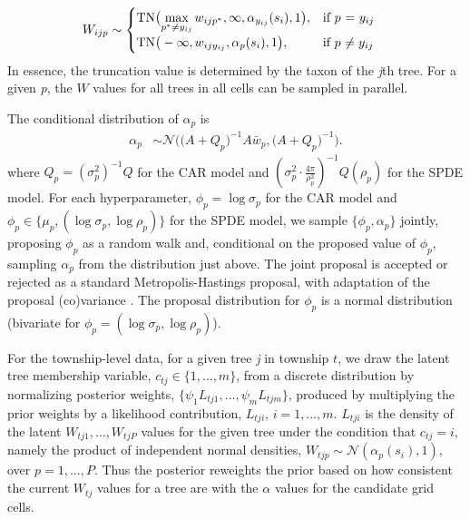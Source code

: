 \documentclass[10pt,letterpaper]{article}
\newcommand{\N}{\mathcal{N}}
\begin{document}
\begin{align}
W_{ijp} & \sim\begin{cases}
\mbox{TN}\big({\displaystyle \max_{p^{*}\neq y_{ij}}w_{ijp^{*}},\infty,\alpha_{y_{ij}}(s_{i}),1\big),} & \mbox{if }p\mbox{ = \ensuremath{y_{ij}}}\\
\mbox{TN}\big(-\infty,w_{ijy_{ij}},\alpha_{p}(s_{i}),1\big), & \mbox{if }p\mbox{ \ensuremath{\neq y_{ij}}}
\end{cases} \nonumber
\end{align}
In essence, the truncation value is determined by the taxon of the
\emph{j}th tree. For a given \emph{p}, the $W$ values for all trees in all
cells can be sampled in parallel. 

The conditional distribution of $\alpha_{p}$ is 
\begin{align}
\alpha_{p} & \sim\N\bigg(\Big(A+Q_{p}\Big)^{-1}A\bar{w}_{p},\Big(A+Q_{p}\Big)^{-1}\bigg). \nonumber
\end{align}
where $Q_{p}=(\sigma_{p}^{2})^{-1}Q$ for the CAR model and $\left(\sigma_{p}^{2}\cdot\frac{4\pi}{\rho_{p}^{2}}\right)^{-1}Q(\rho_{p})$
for the SPDE model. For each hyperparameter, $\phi_{p}=\log\sigma_{p}$
for the CAR model and $\phi_{p}\in\{\mu_{p},(\log\sigma_{p},\log\rho_{p})\}$
for the SPDE model, we sample $\{\phi_{p},\alpha_{p}\}$ jointly,
proposing $\phi_{p}$ as a random walk and, conditional on the proposed
value of $\phi_{p}$, sampling $\alpha_{p}$ from the distribution
just above. The joint proposal is accepted or rejected as a standard
Metropolis-Hastings proposal, with adaptation of the proposal (co)variance
\cite{Shab:Well:2011}. The proposal distribution for $\phi_{p}$
is a normal distribution (bivariate for $\phi_{p}=(\log\sigma_{p},\log\rho_{p})$).

\noindent 

For the township-level data, for a given tree \emph{j} in township $t$,
we draw the latent tree membership variable, $c_{tj}\in\{1,\ldots,m\}$,
from a discrete distribution by normalizing posterior weights, $\{\psi_{1}L_{tj1},\ldots,\psi_{m}L_{tjm}\}$,
produced by multiplying the prior weights by a likelihood contribution,
$L_{tji}$, $i=1,\ldots,m$. $L_{tji}$ is the density of the latent
$W_{tj1},\ldots,W_{tjP}$ values for the given tree under the condition
that $c_{tj}=i$, namely the product of independent normal densities,
$W_{tjp}\sim\N(\alpha_{p}(s_{i}),1)$, over $p=1,\ldots,P$.
Thus the posterior reweights the prior based on how consistent the
current $W_{tj}$ values for a tree are with the $\alpha$ values
for the candidate grid cells. 
\end{document}
